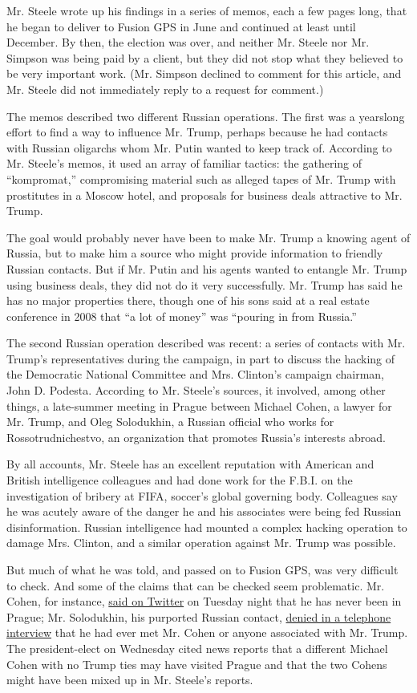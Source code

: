 Mr. Steele wrote up his findings in a series of memos, each a few pages
long, that he began to deliver to Fusion GPS in June and continued at
least until December. By then, the election was over, and neither Mr.
Steele nor Mr. Simpson was being paid by a client, but they did not stop
what they believed to be very important work. (Mr. Simpson declined to
comment for this article, and Mr. Steele did not immediately reply to a
request for comment.)

The memos described two different Russian operations. The first was a
yearslong effort to find a way to influence Mr. Trump, perhaps because
he had contacts with Russian oligarchs whom Mr. Putin wanted to keep
track of. According to Mr. Steele's memos, it used an array of familiar
tactics: the gathering of ``kompromat,'' compromising material such as
alleged tapes of Mr. Trump with prostitutes in a Moscow hotel, and
proposals for business deals attractive to Mr. Trump.

The goal would probably never have been to make Mr. Trump a knowing
agent of Russia, but to make him a source who might provide information
to friendly Russian contacts. But if Mr. Putin and his agents wanted to
entangle Mr. Trump using business deals, they did not do it very
successfully. Mr. Trump has said he has no major properties there,
though one of his sons said at a real estate conference in 2008 that ``a
lot of money'' was ``pouring in from Russia.''

The second Russian operation described was recent: a series of contacts
with Mr. Trump's representatives during the campaign, in part to discuss
the hacking of the Democratic National Committee and Mrs. Clinton's
campaign chairman, John D. Podesta. According to Mr. Steele's sources,
it involved, among other things, a late-summer meeting in Prague between
Michael Cohen, a lawyer for Mr. Trump, and Oleg Solodukhin, a Russian
official who works for Rossotrudnichestvo, an organization that promotes
Russia's interests abroad.

By all accounts, Mr. Steele has an excellent reputation with American
and British intelligence colleagues and had done work for the F.B.I. on
the investigation of bribery at FIFA, soccer's global governing body.
Colleagues say he was acutely aware of the danger he and his associates
were being fed Russian disinformation. Russian intelligence had mounted
a complex hacking operation to damage Mrs. Clinton, and a similar
operation against Mr. Trump was possible.

But much of what he was told, and passed on to Fusion GPS, was very
difficult to check. And some of the claims that can be checked seem
problematic. Mr. Cohen, for instance,
\href{https://twitter.com/MichaelCohen212/status/818991277685567489}{said
on Twitter} on Tuesday night that he has never been in Prague; Mr.
Solodukhin, his purported Russian contact,
\href{https://www.nytimes3xbfgragh.onion/2017/01/10/us/politics/donald-trump-russia-intelligence.html}{denied
in a telephone interview} that he had ever met Mr. Cohen or anyone
associated with Mr. Trump. The president-elect on Wednesday cited news
reports that a different Michael Cohen with no Trump ties may have
visited Prague and that the two Cohens might have been mixed up in Mr.
Steele's reports.

